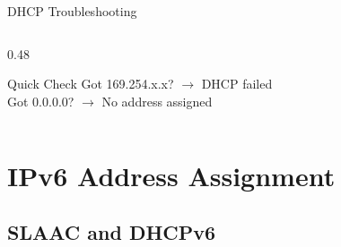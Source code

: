 \documentclass[aspectratio=169]{beamer}  %
\begin{document}
\begin{frame}{DHCP Troubleshooting}
\begin{columns}[T]
\begin{column}{0.48\textwidth}
            \vspace{0.2em}
            \begin{exampleblock}{Quick Check}
                \small
                Got 169.254.x.x? $\rightarrow$ DHCP failed \\
                Got 0.0.0.0? $\rightarrow$ No address assigned
            \end{exampleblock}
        \end{column}
    \end{columns}
\end{frame}

\section{IPv6 Address Assignment}
\subsection{SLAAC and DHCPv6}

\end{document}
